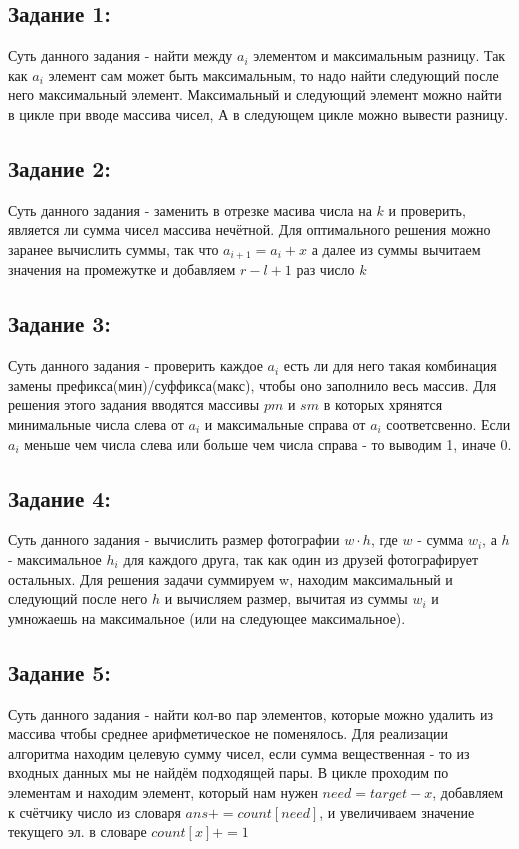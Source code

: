 \subsection*{Задание 1:}

\noindent \indent
Суть данного задания - найти между $a_i$ элементом и максимальным разницу.
Так как $a_i$ элемент сам может быть максимальным, то надо найти следующий после него максимальный элемент.
Максимальный и следующий элемент можно найти в цикле при вводе массива чисел, А в следующем цикле можно вывести разницу.
\newpage
\subsection*{Задание 2:}

\noindent \indent
Суть данного задания - заменить в отрезке масива числа на $k$ и проверить, является ли сумма чисел массива нечётной.
Для оптимального решения можно заранее вычислить суммы, так что $a_{i+1} = a_i + x$
а далее из суммы вычитаем значения на промежутке и добавляем $r-l+1$ раз число $k$
\newpage
\subsection*{Задание 3:}

\noindent \indent
Суть данного задания - проверить каждое $a_i$ есть ли для него такая комбинация замены префикса(мин)/суффикса(макс),
чтобы оно заполнило весь массив. Для решения этого задания вводятся массивы $pm$ и $sm$
в которых хрянятся минимальные числа слева от $a_i$ и максимальные справа от $a_i$ соответсвенно.
Если $a_i$ меньше чем числа слева или больше чем числа справа - то выводим 1, иначе 0.
\newpage
\subsection*{Задание 4:}

\noindent \indent
Суть данного задания - вычислить размер фотографии $w \cdot h$, где $w$ - сумма $w_i$, а $h$ - максимальное $h_i$
для каждого друга, так как один из друзей фотографирует остальных. Для решения задачи суммируем w, находим максимальный
и следующий после него $h$ и вычисляем размер, вычитая из суммы $w_i$ и умножаешь на максимальное (или на следующее максимальное).
\newpage
\subsection*{Задание 5:}

\noindent \indent
Суть данного задания - найти кол-во пар элементов, которые можно удалить из массива чтобы среднее арифметическое не поменялось.
Для реализации алгоритма находим целевую сумму чисел, если сумма вещественная - то из входных данных мы не найдём подходящей пары.
В цикле проходим по элементам и находим элемент, который нам нужен $need = target - x$, добавляем к счётчику число из словаря $ans += count[need]$,
и увеличиваем значение текущего эл. в словаре $count[x] += 1$
\newpage